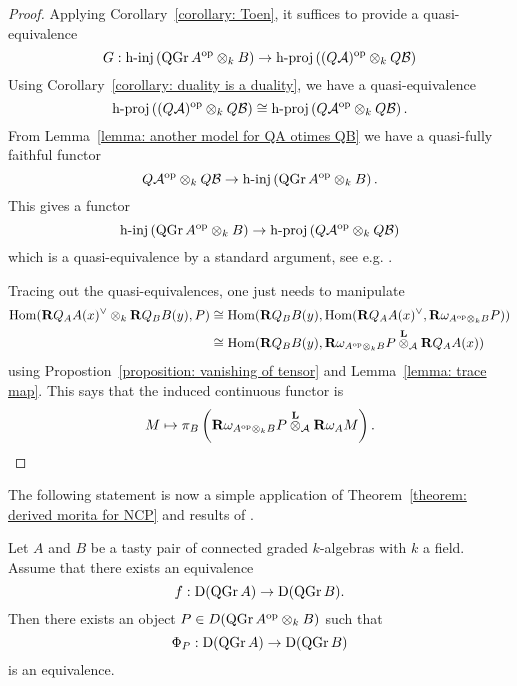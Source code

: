 \documentclass[dissertation.tex]{subfiles}
\begin{document}
\begin{proof}
  Applying Corollary~\ref{corollary: Toen}, it suffices to provide a quasi-equivalence
  \begin{displaymath}
    G : \operatorname{h-inj}\left(\operatorname{QGr}A^{\operatorname{op}} \otimes_k B\right) \to \operatorname{h-proj}\left( (Q \mathcal A)^{\operatorname{op}} \otimes_k Q \mathcal B\right)
  \end{displaymath}
  Using Corollary~\ref{corollary: duality is a duality}, we have a quasi-equivalence
  \begin{displaymath}
    \operatorname{h-proj}\left( (Q \mathcal A)^{\operatorname{op}} \otimes_k Q \mathcal B\right) \cong \operatorname{h-proj}\left( Q \mathcal A^{\operatorname{op}} \otimes_k Q \mathcal B\right). 
  \end{displaymath}
  From Lemma~\ref{lemma: another model for QA otimes QB} we have a quasi-fully faithful functor 
  \begin{displaymath}
    Q \mathcal A^{\operatorname{op}} \otimes_k Q \mathcal B \to \operatorname{h-inj}\left(\operatorname{QGr}A^{\operatorname{op}} \otimes_k B\right). 
  \end{displaymath}
  This gives a functor 
  \begin{displaymath}
    \operatorname{h-inj}\left(\operatorname{QGr}A^{\operatorname{op}} \otimes_k B\right) \to \operatorname{h-proj}\left(Q \mathcal A^{\operatorname{op}} \otimes_k Q \mathcal B\right)
  \end{displaymath}
  which is a quasi-equivalence by a standard argument, see e.g. \cite[Theorem 5.1]{Dyckerhoff}.
  
  Tracing out the quasi-equivalences, one just needs to manipulate 
  \begin{align*}
    \operatorname{Hom} (\mathbf{R}Q_A A(x)^\vee \otimes_k \mathbf{R}Q_B B(y), P) & \cong \operatorname{Hom} ( \mathbf{R}Q_B B(y) , \operatorname{Hom}( \mathbf{R}Q_A A(x)^\vee, \mathbf{R}\omega_{A^{\operatorname{op}} \otimes_k B} P)) \\
    & \cong \operatorname{Hom} ( \mathbf{R}Q_B B(y) , \mathbf{R}\omega_{A^{\operatorname{op}} \otimes_k B} P \overset{\mathbf{L}}{\otimes}_{\mathcal A} \mathbf{R}Q_A A(x) ) 
  \end{align*}
  using Propostion~\ref{proposition: vanishing of tensor} and Lemma~\ref{lemma: trace map}. This says that the induced continuous functor is
  \begin{displaymath}
    M \mapsto \pi_B \left( \mathbf{R}\omega_{A^{\operatorname{op}} \otimes_k B} P \overset{\mathbf{L}}{\otimes}_{\mathcal A} \mathbf{R}\omega_A M \right). 
  \end{displaymath}
\end{proof}

The following statement is now a simple application of Theorem~\ref{theorem: derived morita for NCP} and results of \cite{Lunts-Orlov}. 

\begin{corollary} \label{corollary: NCP morita}
  Let \(A\) and \(B\) be a tasty pair of connected graded \(k\)-algebras with \(k\) a field. Assume that there exists an equivalence
  \begin{displaymath}
    f : \mathrm{D} (\operatorname{QGr}A) \to \mathrm{D} (\operatorname{QGr}B).
  \end{displaymath}
  Then there exists an object \(P \in D ( \operatorname{QGr}A^{\operatorname{op}} \otimes_k B )\) such that 
  \begin{displaymath}
    \Phi_P : \mathrm{D} ( \operatorname{QGr}A) \to \mathrm{D} (\operatorname{QGr}B )
  \end{displaymath}
  is an equivalence.
\end{corollary}
\end{document}
